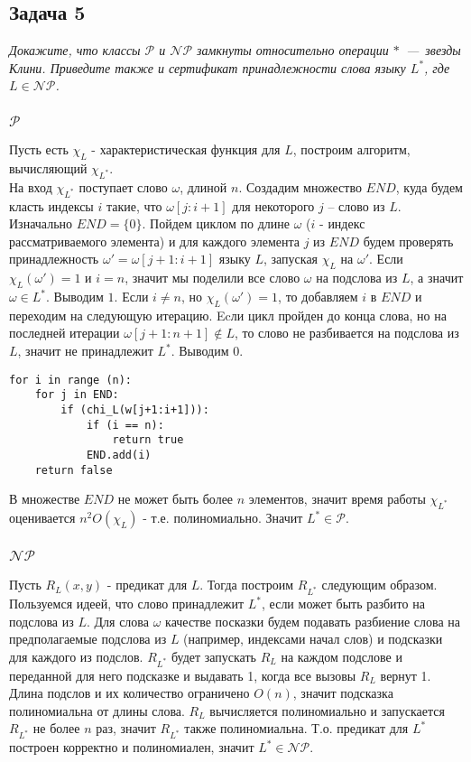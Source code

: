 \documentclass{article}
\begin{document}
\subsection*{Задача 5}
\textit{Докажите, что классы $\mathcal{P}$ и $\mathcal{NP}$ замкнуты относительно операции $*$~---~звезды Клини. Приведите также и сертификат принадлежности слова языку $L^*$, где $L\in\mathcal{NP}$.}
\subsubsection*{$\mathcal{P}$}
Пусть есть $\chi_L$ - характеристическая функция для $L$, построим алгоритм, вычисляющий $\chi_{L^*}$.\\
На вход $\chi_{L^*}$ поступает слово $\omega$, длиной $n$. Создадим множество $END$, куда будем класть индексы $i$ такие, что $\omega[j:i+1]$ для некоторого $j$ -- слово из $L$. Изначально $END = \{0\}$. Пойдем циклом по длине $\omega$ ($i$ - индекс рассматриваемого элемента) и для каждого элемента $j$ из $END$ будем проверять принадлежность $\omega' = \omega[j+1:i+1]$ языку $L$, запуская $\chi_L$ на $\omega'$. Если $\chi_L(\omega') = 1$ и $i = n$, значит мы поделили все слово $\omega$ на подслова из $L$, а значит $\omega \in L^*$. Выводим $1$. Если $i \neq n$, но $\chi_L(\omega') = 1$, то добавляем $i$   в $END$ и переходим на следующую итерацию. Ecли цикл пройден до конца слова, но на последней итерации $\omega[j+1:n+1] \notin L$, то слово не разбивается на подслова из $L$, значит не принадлежит $L^*$. Выводим $0$.
\begin{lstlisting}
for i in range (n):
    for j in END:
        if (chi_L(w[j+1:i+1])):
            if (i == n):
                return true
            END.add(i)
    return false
\end{lstlisting}
В множестве $END$ не может быть более $n$ элементов, значит время работы $\chi_{L^*}$ оценивается $n^2O(\chi_L)$ - т.е. полиномиально. Значит $L^* \in \mathcal{P}$.
\subsubsection*{$\mathcal{NP}$}
Пусть $R_L(x, y)$ - предикат для $L$. Тогда построим $R_{L^*}$ следующим образом. Пользуемся идеей, что слово принадлежит $L^*$, если может быть разбито на подслова из $L$. Для слова $\omega$ качестве посказки будем подавать разбиение слова на предполагаемые подслова из $L$ (например, индексами начал слов) и подсказки для каждого из подслов. $R_{L^*}$ будет запускать $R_L$ на каждом подслове и переданной для него подсказке и выдавать 1, когда все вызовы $R_L$ вернут 1. Длина подслов и их количество ограничено $O(n)$, значит подсказка полиномиальна от длины слова. $R_L$ вычисляется полиномиально и запускается $R_{L^*}$ не более $n$ раз, значит $R_{L^*}$ также полиномиальна. Т.о. предикат для $L^*$ построен корректно и полиномиален, значит  $L^* \in \mathcal{NP}$.
\end{document}
